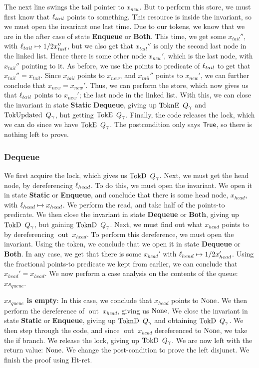 \documentclass[twoside,11pt,openright]{report}
\newcommand{\nOut}[1]{\operatorname{out} \; #1}
\newcommand{\StaticState}{\textbf{Static}}
\newcommand{\EnqueueState}{\textbf{Enqueue}}
\newcommand{\DequeueState}{\textbf{Dequeue}}
\newcommand{\BothState}{\textbf{Both}}
\newcommand{\Qgnames}{Q_\gname}
\newcommand{\TokE}[1]{\operatorname{TokE}\ #1}
\newcommand{\TokEQg}{\TokE{\Qgnames}}
\newcommand{\ToknE}[1]{\operatorname{ToknE}\ #1}
\newcommand{\ToknEQg}{\ToknE{\Qgnames}}
\newcommand{\TokD}[1]{\operatorname{TokD}\ #1}
\newcommand{\TokDQg}{\TokD{\Qgnames}}
\newcommand{\ToknD}[1]{\operatorname{ToknD}\ #1}
\newcommand{\ToknDQg}{\ToknD{\Qgnames}}
\newcommand{\TokUpdated}[1]{\operatorname{TokUpdated}\ #1}
\newcommand{\TokUpdatedQg}{\TokUpdated{\Qgnames}}
\begin{document}
The next line swings the tail pointer to $x_{new}$. But to perform this store, we must first know that $\ell_{tail}$ points to something. This resource is inside the invariant, so we must open the invariant one last time. Due to our tokens, we know that we are in the after case of state \EnqueueState{} or \BothState{}. This time, we get some $x_{tail}''$, with $\ell_{tail} \mapsto{1/2} x_{tail}''$, but we also get that $x_{tail}''$ is only the second last node in the linked list. Hence there is some other node $x_{new}'$, which is the last node, with $x_{tail}''$ pointing to it. As before, we use the points to predicate of $\ell_{tail}$ to get that $x_{tail}'' = x_{tail}$. Since $x_{tail}$ points to $x_{new}$, and $x_{tail}''$ points to $x_{new}'$, we can further conclude that $x_{new} = x_{new}'$. Thus, we can perform the store, which now gives us that $\ell_{tail}$ points to $x_{new}'$; the last node in the linked list. With this, we can close the invariant in state \StaticState{} \DequeueState{}, giving up $\ToknEQg$ and $\TokUpdatedQg$, but getting $\TokEQg$. Finally, the code releases the lock, which we can do since we have $\TokEQg$. The postcondition only says $\textsf{True}$, so there is nothing left to prove.

\subsubsection{Dequeue}
We first acquire the lock, which gives us $\TokDQg$. Next, we must get the head node, by dereferencing $\ell_{head}$. To do this, we must open the invariant. We open it in state \StaticState{} or \EnqueueState{}, and conclude that there is some head node, $x_{head}$, with $\ell_{head} \mapsto x_{head}$. We perform the read, and take half of the points-to predicate. We then close the invariant in state \DequeueState{} or \BothState{}, giving up $\TokDQg$, but gaining $\ToknDQg$. Next, we must find out what $x_{head}$ points to by dereferencing $\nOut{x_{head}}$. To perform this dereference, we must open the invariant. Using the token, we conclude that we open it in state \DequeueState{} or \BothState{}. In any case, we get that there is some $x_{head}'$ with $\ell_{head} \mapsto{1/2} x_{head}'$. Using the fractional points-to predicate we kept from earlier, we can conclude that $x_{head}' = x_{head}$. We now perform a case analysis on the contents of the queue: $xs_{queue}$.

\textbf{$xs_{queue}$ is empty}: In this case, we conclude that $x_{head}$ points to $\operatorname{None}$. We then perform the dereference of $\nOut{x_{head}}$, giving us $\operatorname{None}$. We close the invariant in state \StaticState{} or \EnqueueState{}, giving up $\ToknDQg$ and obtaining $\TokDQg$. We then step through the code, and since $\nOut{x_{head}}$ dereferenced to $\operatorname{None}$, we take the if branch. We release the lock, giving up $\TokDQg$. We are now left with the return value: $\operatorname{None}$. We change the post-condition to prove the left disjunct. We finish the proof using Ht-ret.
\end{document}
